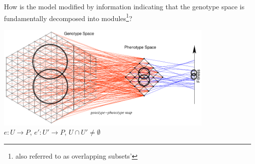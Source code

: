 \begin{frame}
How is the model modified by information indicating that the genotype space is fundamentally decomposed into modules\footnote{also referred to as overlapping subsets'}?
\begin{center}
\includegraphics[width=0.8\textwidth]{fig/gpmapmod.pdf}\\
$e \colon U \longrightarrow P$, $e' \colon U' \longrightarrow P$, $U \cap U' \neq \emptyset$
\end{center}
\end{frame}
